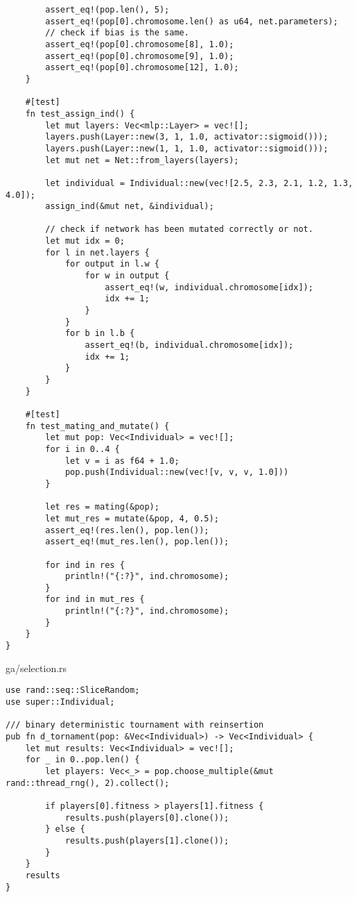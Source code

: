 \begin{code}
\begin{verbatim}
        assert_eq!(pop.len(), 5);
        assert_eq!(pop[0].chromosome.len() as u64, net.parameters);
        // check if bias is the same.
        assert_eq!(pop[0].chromosome[8], 1.0);
        assert_eq!(pop[0].chromosome[9], 1.0);
        assert_eq!(pop[0].chromosome[12], 1.0);
    }

    #[test]
    fn test_assign_ind() {
        let mut layers: Vec<mlp::Layer> = vec![];
        layers.push(Layer::new(3, 1, 1.0, activator::sigmoid()));
        layers.push(Layer::new(1, 1, 1.0, activator::sigmoid()));
        let mut net = Net::from_layers(layers);

        let individual = Individual::new(vec![2.5, 2.3, 2.1, 1.2, 1.3, 4.0]);
        assign_ind(&mut net, &individual);

        // check if network has been mutated correctly or not.
        let mut idx = 0;
        for l in net.layers {
            for output in l.w {
                for w in output {
                    assert_eq!(w, individual.chromosome[idx]);
                    idx += 1;
                }
            }
            for b in l.b {
                assert_eq!(b, individual.chromosome[idx]);
                idx += 1;
            }
        }
    }

    #[test]
    fn test_mating_and_mutate() {
        let mut pop: Vec<Individual> = vec![];
        for i in 0..4 {
            let v = i as f64 + 1.0;
            pop.push(Individual::new(vec![v, v, v, 1.0]))
        }

        let res = mating(&pop);
        let mut_res = mutate(&pop, 4, 0.5);
        assert_eq!(res.len(), pop.len());
        assert_eq!(mut_res.len(), pop.len());

        for ind in res {
            println!("{:?}", ind.chromosome);
        }
        for ind in mut_res {
            println!("{:?}", ind.chromosome);
        }
    }
}

\end{verbatim}
\end{code}

\begin{code}  
\caption{ga/selection.rs}
\label{src:select}
\begin{verbatim}
use rand::seq::SliceRandom;
use super::Individual;

/// binary deterministic tournament with reinsertion
pub fn d_tornament(pop: &Vec<Individual>) -> Vec<Individual> {
    let mut results: Vec<Individual> = vec![];
    for _ in 0..pop.len() {
        let players: Vec<_> = pop.choose_multiple(&mut rand::thread_rng(), 2).collect();

        if players[0].fitness > players[1].fitness {
            results.push(players[0].clone());
        } else {
            results.push(players[1].clone());
        }
    }
    results
}

\end{verbatim}
\end{code}

